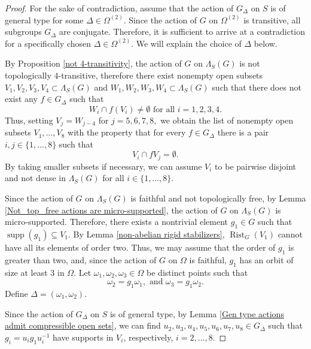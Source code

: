 \documentclass[11pt,letterpaper]{article}
\DeclareMathOperator{\rist}{Rist}
\DeclareMathOperator{\supp}{supp}
\theoremstyle{definition}
\theoremstyle{remark}
\begin{document}
\begin{proof}
    For the sake of contradiction, assume that the action of $G_\Delta$ on $S$ is of general type for some $\Delta \in \Omega^{(2)}$. Since the action of $G$ on $\Omega^{(2)}$ is transitive, all subgroups $G_\Delta$ are conjugate. Therefore, it is sufficient to arrive at a contradiction for a specifically chosen $\Delta \in \Omega^{(2)}$. We will explain the choice of $\Delta$ below.   
   
    By Proposition \ref{not 4-transitivity}, the action of $G$ on $\Lambda_S(G)$ is not topologically $4$-transitive, therefore there exist nonempty open subsets $V_1, V_2, V_3, V_4 \subset \Lambda_S(G)$ and $W_1, W_2, W_3, W_4 \subset \Lambda_S(G)$ such that there does not exist any $f \in G_\Delta$  such that
    $$
    W_i \cap f(V_i) \neq \emptyset \text{ for all } i=1,2,3,4.
    $$
    Thus, setting $V_j=W_{j-4}$ for $j=5,6,7,8,$ we obtain the list of nonempty open subsets $V_1, \dots, V_8$ with the property that for every $f \in G_\Delta$ there is a pair $i,j \in \{1, \dots, 8\}$ such that 
    \begin{equation}\label{something is disjoint}
V_i \cap fV_j = \emptyset. 
    \end{equation}
By taking smaller subsets if necessary, we can assume $V_i$ to be pairwise disjoint and not dense in $\Lambda_S(G)$ for all $i \in \{1,\dots, 8\}$. 
  
  Since the action of $G$ on $\Lambda_S(G)$ is faithful and not topologically free, by Lemma \ref{Not_top_free actions are micro-supported}, the action of $G$ on $\Lambda_S(G)$ is micro-supported. Therefore, there exists a nontrivial element $g_1 \in G$ such that $\supp(g_1) \subseteq V_1$. By Lemma \ref{non-abelian rigid stabilizers}, $\rist_G(V_1)$ cannot have all its elements of order two. Thus, we may assume that the order of $g_1$ is greater than two, and, since the action of $G$ on $\Omega$ is faithful, $g_1$ has an orbit of size at least $3$ in $\Omega$. Let $\omega_1, \omega_2, \omega_3 \in \Omega$ be distinct points such that
  \begin{equation}\label{choice of delta}
  \omega_2=g_1\omega_1, \text{ and } \omega_3=g_1\omega_2.
  \end{equation}
  Define $\Delta= (\omega_1, \omega_2)$. 

Since the action of $G_\Delta$ on $S$ is of general type, by Lemma \ref{Gen type actions admit compressible open sets}, we can find $u_2, u_3, u_4, u_5, u_6, u_7, u_8 \in G_\Delta$ such that $g_i=u_ig_1u_i^{-1}$ have supports in $V_i$, respectively, $i=2, \dots, 8$. 


\end{proof}
\end{document}
